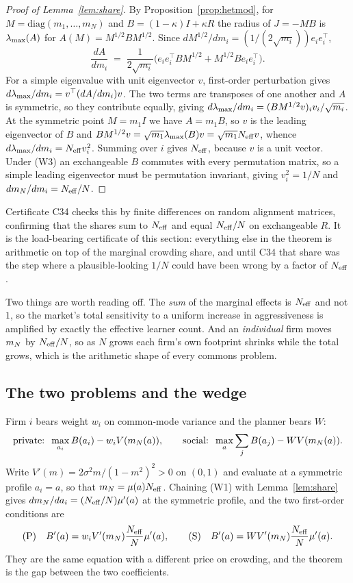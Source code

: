 \begin{proof}[Proof of Lemma~\ref{lem:share}]
By Proposition~\ref{prop:hetmod}, for $M = \mathrm{diag}(m_1,\ldots,m_N)$ and $B = (1-\kappa)I + \kappa R$ the radius of $J = -MB$ is $\lambda_{\max}(A)$ for $A(M) = M^{1/2}BM^{1/2}$. Since $dM^{1/2}/dm_i = (1/(2\sqrt{m_i}))e_ie_i^{\top}$,
\[
  \frac{dA}{dm_i} \;=\; \frac{1}{2\sqrt{m_i}}\Big(e_ie_i^{\top}BM^{1/2} + M^{1/2}Be_ie_i^{\top}\Big).
\]
For a simple eigenvalue with unit eigenvector $v$, first-order perturbation gives $d\lambda_{\max}/dm_i = v^{\top}(dA/dm_i)v$. The two terms are transposes of one another and $A$ is symmetric, so they contribute equally, giving $d\lambda_{\max}/dm_i = (BM^{1/2}v)_i v_i/\sqrt{m_i}$. At the symmetric point $M = m_1I$ we have $A = m_1B$, so $v$ is the leading eigenvector of $B$ and $BM^{1/2}v = \sqrt{m_1}\lambda_{\max}(B)v = \sqrt{m_1}N_{\mathrm{eff}} v$, whence $d\lambda_{\max}/dm_i = N_{\mathrm{eff}} v_i^2$. Summing over $i$ gives $N_{\mathrm{eff}}$, because $v$ is a unit vector. Under (W3) an exchangeable $B$ commutes with every permutation matrix, so a simple leading eigenvector must be permutation invariant, giving $v_i^2 = 1/N$ and $dm_N/dm_i = N_{\mathrm{eff}}/N$.
\end{proof}

Certificate C34 checks this by finite differences on random alignment matrices, confirming that the shares sum to $N_{\mathrm{eff}}$ and equal $N_{\mathrm{eff}}/N$ on exchangeable $R$. It is the load-bearing certificate of this section: everything else in the theorem is arithmetic on top of the marginal crowding share, and until C34 that share was the step where a plausible-looking $1/N$ could have been wrong by a factor of $N_{\mathrm{eff}}$.

Two things are worth reading off. The \emph{sum} of the marginal effects is $N_{\mathrm{eff}}$ and not $1$, so the market's total sensitivity to a uniform increase in aggressiveness is amplified by exactly the effective learner count. And an \emph{individual} firm moves $m_N$ by $N_{\mathrm{eff}}/N$, so as $N$ grows each firm's own footprint shrinks while the total grows, which is the arithmetic shape of every commons problem.

\subsection{The two problems and the wedge}

Firm $i$ bears weight $w_i$ on common-mode variance and the planner bears $W$:
\[
  \text{private:}\;\; \max_{a_i} B(a_i) - w_iV(m_N(a)),
  \qquad
  \text{social:}\;\; \max_{a} \sum_j B(a_j) - WV(m_N(a)).
\]
Write $V'(m) = 2\sigma^2m/(1-m^2)^2 > 0$ on $(0,1)$ and evaluate at a symmetric profile $a_i = a$, so that $m_N = \mu(a)N_{\mathrm{eff}}$. Chaining (W1) with Lemma~\ref{lem:share} gives $dm_N/da_i = (N_{\mathrm{eff}}/N)\mu'(a)$ at the symmetric profile, and the two first-order conditions are
\[
  \text{(P)}\quad B'(a) = w_i V'(m_N)\frac{N_{\mathrm{eff}}}{N}\mu'(a),
  \qquad
  \text{(S)}\quad B'(a) = W V'(m_N)\frac{N_{\mathrm{eff}}}{N}\mu'(a).
\]
They are the same equation with a different price on crowding, and the theorem is the gap between the two coefficients.

